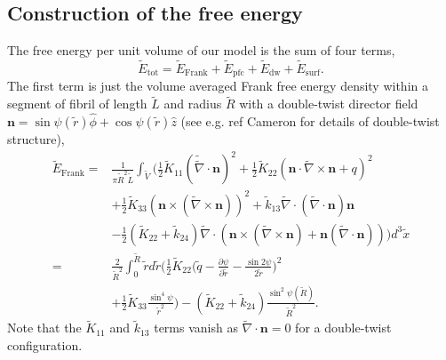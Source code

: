 \documentclass[%
 reprint,
 amsmath,amssymb,
 aps,
]{revtex4-1}
\begin{document}
\subsection{\label{sub:model}Construction of the free energy}
The free energy per unit volume of our model is the sum of four terms,
\begin{equation}\label{eq:Esum}
\tilde{E}_{\textrm{tot}}=\tilde{E}_{\textrm{Frank}}+\tilde{E}_{\textrm{pfc}}+\tilde{E}_{\textrm{dw}}+\tilde{E}_{\textrm{surf}}.
\end{equation}
The first term is just the volume averaged Frank free energy density within a segment of fibril of length $\tilde{L}$ and radius $\tilde{R}$ with a double-twist director field $\bm{n}=\sin\psi(\tilde{r})\hat{\phi}+\cos\psi(\tilde{r})\hat{z}$ (see e.g. ref Cameron for details of double-twist structure),
\begin{align}\label{eq:Efrank}
\tilde{E}_{\textrm{Frank}}=&\frac{1}{\pi \tilde{R}^2\tilde{L}} \int_{\tilde{V}}\bigg(\frac{1}{2}\tilde{K}_{11}(\tilde{\tilde{\nabla}}\cdot\bm{n})^2+\frac{1}{2}\tilde{K}_{22}(\bm{n}\cdot\tilde{\nabla}\times\bm{n}+q)^2\nonumber\\
&+\frac{1}{2}\tilde{K}_{33}(\bm{n}\times(\tilde{\nabla}\times\bm{n}))^2+\tilde{k}_{13}\tilde{\nabla}\cdot(\tilde{\nabla}\cdot\bm{n})\bm{n}\nonumber\\
&-\frac{1}{2}(\tilde{K}_{22}+\tilde{k}_{24})\tilde{\nabla}\cdot(\bm{n}\times(\tilde{\nabla}\times\bm{n})+\bm{n}(\tilde{\nabla}\cdot\bm{n}))\bigg)d^3\tilde{x}\nonumber\\
=&\frac{2}{\tilde{R}^2}\int_0^{\tilde{R}}\tilde{r}d\tilde{r}\bigg(\frac{1}{2}\tilde{K}_{22}\bigg(\tilde{q}-\frac{\partial\psi}{\partial\tilde{r}}-\frac{\sin2\psi}{2\tilde{r}}\bigg)^2\nonumber\\
&+\frac{1}{2}\tilde{K}_{33}\frac{\sin^4\psi}{\tilde{r}^2}\bigg)-(\tilde{K}_{22}+\tilde{k}_{24})\frac{\sin^2\psi(\tilde{R})}{\tilde{R}^2}.
\end{align}
Note that the $\tilde{K}_{11}$ and $\tilde{k}_{13}$ terms vanish as $\tilde{\nabla}\cdot\bm{n}=0$ for a double-twist configuration.
\end{document}
